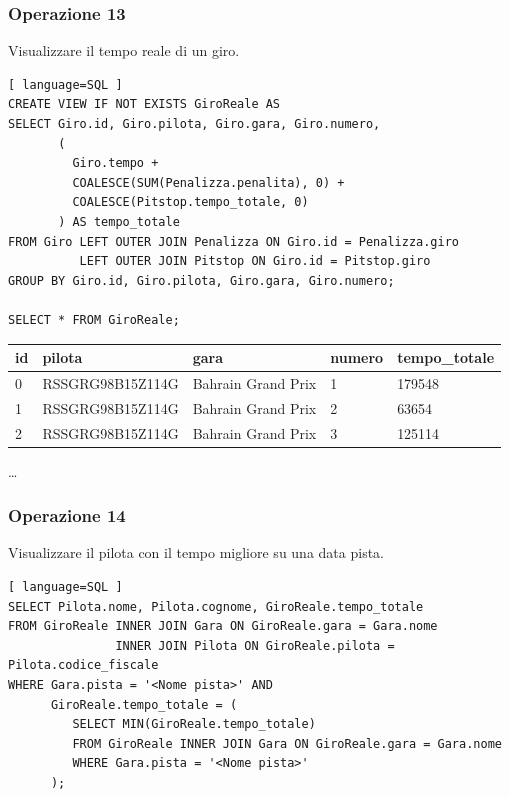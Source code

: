 \documentclass[11pt]{article}
\begin{document}
\subsubsection{Operazione 13}
Visualizzare il tempo reale di un giro.
\begin{lstlisting}[ language=SQL ]
CREATE VIEW IF NOT EXISTS GiroReale AS
SELECT Giro.id, Giro.pilota, Giro.gara, Giro.numero, 
       (
         Giro.tempo + 
         COALESCE(SUM(Penalizza.penalita), 0) + 
         COALESCE(Pitstop.tempo_totale, 0)
       ) AS tempo_totale
FROM Giro LEFT OUTER JOIN Penalizza ON Giro.id = Penalizza.giro
          LEFT OUTER JOIN Pitstop ON Giro.id = Pitstop.giro
GROUP BY Giro.id, Giro.pilota, Giro.gara, Giro.numero;

SELECT * FROM GiroReale;
\end{lstlisting}

\begin{center}
    \begin{table}[H]
        \centering
        \begin{tabular}{|l|l|l|l|l|}
            \hline
            id & pilota & gara & numero & tempo\_totale \\ \hline
            0 & RSSGRG98B15Z114G & Bahrain Grand Prix & 1 & 179548 \\ \hline
            1 & RSSGRG98B15Z114G & Bahrain Grand Prix & 2 & 63654 \\ \hline
            2 & RSSGRG98B15Z114G & Bahrain Grand Prix & 3 & 125114 \\ \hline
        \end{tabular}
    \end{table}
    \vspace*{-1em}
    \dots
\end{center}


\newpage
\subsubsection{Operazione 14}
Visualizzare il pilota con il tempo migliore su una data pista.
\begin{lstlisting}[ language=SQL ]
SELECT Pilota.nome, Pilota.cognome, GiroReale.tempo_totale
FROM GiroReale INNER JOIN Gara ON GiroReale.gara = Gara.nome
               INNER JOIN Pilota ON GiroReale.pilota = Pilota.codice_fiscale
WHERE Gara.pista = '<Nome pista>' AND
      GiroReale.tempo_totale = (
         SELECT MIN(GiroReale.tempo_totale)
         FROM GiroReale INNER JOIN Gara ON GiroReale.gara = Gara.nome
         WHERE Gara.pista = '<Nome pista>'
      );
\end{lstlisting}
\end{document}
